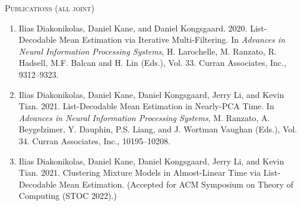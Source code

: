\documentclass[letterpaper,oneside,english,11pt,openany]{memoir}
\begin{document}
\begin{center}
  \Large\scshape Publications (all joint)
\end{center}
\begin{enumerate}[$\bullet$]
  \item Ilias Diakonikolas, Daniel Kane, and Daniel Kongsgaard. 2020. List-Decodable Mean Estimation via Iterative Multi-Filtering. In \emph{Advances in Neural Information Processing Systems}, H. Larochelle, M. Ranzato, R. Hadsell, M.F. Balcan and H. Lin (Eds.), Vol. 33. Curran Associates, Inc., 9312--9323.

  \item Ilias Diakonikolas, Daniel Kane, Daniel Kongsgaard, Jerry Li, and Kevin Tian. 2021. List-Decodable Mean Estimation in Nearly-PCA Time. In \emph{Advances in Neural Information Processing Systems}, M. Ranzato, A. Beygelzimer, Y. Dauphin, P.S. Liang, and J. Wortman Vaughan (Eds.), Vol. 34. Curran Associates, Inc., 10195--10208.

  \item Ilias Diakonikolas, Daniel Kane, Daniel Kongsgaard, Jerry Li, and Kevin Tian. 2021. Clustering Mixture Models in Almost-Linear Time via List-Decodable Mean Estimation. (Accepted for ACM Symposium on Theory of Computing (STOC 2022).)
\end{enumerate}



\clearpage

\end{document}
